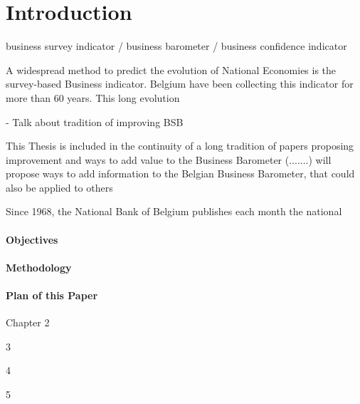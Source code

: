 \documentclass[12pt,a4paper,oneside]{book}
\begin{document}
\newpage
\setcounter{page}{0}


\chapter{Introduction}

business survey indicator / business barometer / business confidence indicator

A widespread method to predict the evolution of National Economies is the survey-based Business indicator. Belgium have been collecting this indicator for more than 60 years. This long evolution 

- Talk about tradition of improving BSB

This Thesis is included in the continuity of a long tradition of papers proposing improvement and ways to add value to the Business Barometer (.......) will propose ways to add information to the Belgian Business Barometer, that could also be applied to others

Since 1968, the National Bank of Belgium publishes each month the national 




\subsubsection{Objectives}

\subsubsection{Methodology}

\subsubsection{Plan of this Paper}

Chapter 2

3

4

5
\end{document}
